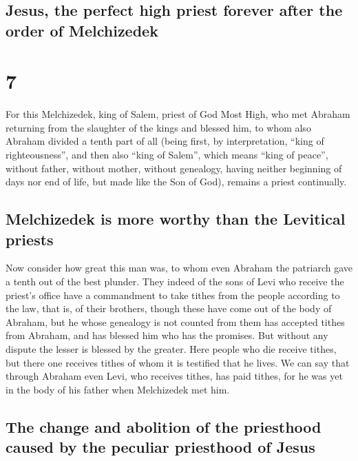 \hypertarget{jesus-the-perfect-high-priest-forever-after-the-order-of-melchizedek}{%
\subsection{Jesus, the perfect high priest forever after the order of
Melchizedek}\label{jesus-the-perfect-high-priest-forever-after-the-order-of-melchizedek}}

\hypertarget{section-6}{%
\section{7}\label{section-6}}

 For this Melchizedek, king of Salem, priest of God Most
High, who met Abraham returning from the slaughter of the kings and
blessed him,  to whom also Abraham divided a tenth part of
all (being first, by interpretation, ``king of righteousness'', and then
also ``king of Salem'', which means ``king of peace'', 
without father, without mother, without genealogy, having neither
beginning of days nor end of life, but made like the Son of God),
remains a priest continually.

\hypertarget{melchizedek-is-more-worthy-than-the-levitical-priests}{%
\subsection{Melchizedek is more worthy than the Levitical
priests}\label{melchizedek-is-more-worthy-than-the-levitical-priests}}

 Now consider how great this man was, to whom even Abraham
the patriarch gave a tenth out of the best plunder.  They
indeed of the sons of Levi who receive the priest's office have a
commandment to take tithes from the people according to the law, that
is, of their brothers, though these have come out of the body of
Abraham,  but he whose genealogy is not counted from them
has accepted tithes from Abraham, and has blessed him who has the
promises.  But without any dispute the lesser is blessed
by the greater.  Here people who die receive tithes, but
there one receives tithes of whom it is testified that he lives.
 We can say that through Abraham even Levi, who receives
tithes, has paid tithes,  for he was yet in the body of
his father when Melchizedek met him.

\hypertarget{the-change-and-abolition-of-the-priesthood-caused-by-the-peculiar-priesthood-of-jesus}{%
\subsection{The change and abolition of the priesthood caused by the
peculiar priesthood of
Jesus}\label{the-change-and-abolition-of-the-priesthood-caused-by-the-peculiar-priesthood-of-jesus}}

